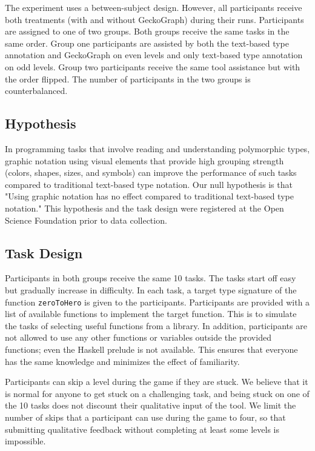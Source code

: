 The experiment uses a between-subject design. However, all participants receive both treatments (with and without GeckoGraph) during their runs.
Participants are assigned to one of two groups. Both groups receive the same tasks in the same order. Group one participants are assisted by both the text-based type annotation and GeckoGraph on even levels and only text-based type annotation on odd levels. Group two participants receive the same tool assistance but with the order flipped. The number of participants in the two groups is counterbalanced.

\subsection{Hypothesis}
In programming tasks that involve reading and understanding polymorphic types, graphic notation using visual elements that provide high grouping strength (colors, shapes, sizes, and symbols) can improve the performance of such tasks compared to traditional text-based type notation. Our null hypothesis is that "Using graphic notation has no effect compared to traditional text-based type notation." This hypothesis and the task design were registered at the Open Science Foundation prior to data collection. 

\subsection{Task Design} \label{subsection:task}
Participants in both groups receive the same 10 tasks. The tasks start off easy but gradually increase in difficulty.  In each task, a target type signature of the function \texttt{zeroToHero} is given to the participants. Participants are provided with a list of available functions to implement the target function. This is to simulate the tasks of selecting useful functions from a library. In addition, participants are not allowed to use any other functions or variables outside the provided functions; even the Haskell prelude is not available. This ensures that everyone has the same knowledge and minimizes the effect of familiarity. 

Participants can skip a level during the game if they are stuck. We believe that it is normal for anyone to get stuck on a challenging task, and being stuck on one of the 10 tasks does not discount their qualitative input of the tool. We limit the number of skips that a participant can use during the game to four, so that submitting qualitative feedback without completing at least some levels is impossible. 

